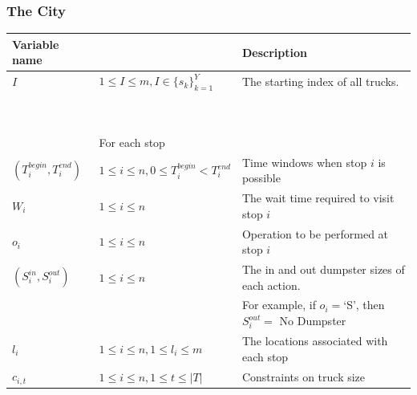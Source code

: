 \documentclass{article}
\begin{document}
\subsubsection{The City}
\begin{tabular}{ l | l | l }
 Variable name                 &                                                                & Description                                                   \\
 \hline
  $I$                          & $ 1 \le I \le m, I \in \{s_k\}_{k=1}^Y                      $  & The starting index of all trucks.                             \\
                               & $                                                           $  &                                                               \\
                               & $                                                           $  &                                                               \\
                               & For each stop                                                  &                                                               \\
  $(T^{begin}_i, T^{end}_i)$   & $  1 \le i \le n, 0\le T^{begin}_i< T^{end}_i               $  & Time windows when stop $i$ is possible                        \\
  $W_i$                        & $  1 \le i \le n                                            $  & The wait time required to visit stop $i$                      \\
  $o_i$                        & $  1 \le i \le n                                            $  & Operation to be performed at stop $i$                         \\
  $(S^{in}_i, S^{out}_i)$      & $  1 \le i \le n                                            $  & The in and out dumpster sizes of each action.                 \\
                               & $                                                           $  & For example, if $o_i = $`S', then $S_i^{out} = $ No Dumpster  \\
  $l_i$                        & $  1 \le i \le n, 1 \le l_i \le m                           $  & The locations associated with each stop                       \\
  $c_{i,t}$                    & $  1 \le i \le n, 1 \le t \le |T|                           $  & Constraints on truck size                                     \\

\end{tabular}
\end{document}
